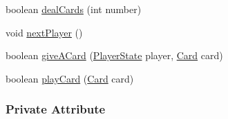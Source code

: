 \begin{DoxyCompactItemize}
\item 
boolean \hyperlink{a00061_acdff77c9c369980f9bab1540f58c4393}{deal\-Cards} (int number)
\item 
\hypertarget{a00061_a75473856648ef2b775e04f4d322b5068}{void \hyperlink{a00061_a75473856648ef2b775e04f4d322b5068}{next\-Player} ()}\label{a00061_a75473856648ef2b775e04f4d322b5068}

\item 
boolean \hyperlink{a00061_ae9373e9985f6fad3724988fb885e367e}{give\-A\-Card} (\hyperlink{a00065}{Player\-State} player, \hyperlink{a00054}{Card} card)
\item 
boolean \hyperlink{a00061_aaf941aefdd9c544e246c4f0cdcdb68ec}{play\-Card} (\hyperlink{a00054}{Card} card)
\end{DoxyCompactItemize}
\subsubsection*{Private Attribute}
